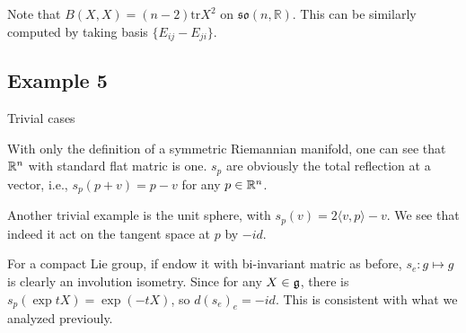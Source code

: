 	Note that $B(X,X)=(n-2)\mathrm{tr}X^2$ on
	$\mathfrak{so}(n,\mathbb R)$. This can be similarly computed
	by taking basis $\{E_{ij}-E_{ji}\}$.
	
	\subsection{Example 5}
	\begin{center}
		Trivial cases
	\end{center}
	
	With only the definition of a symmetric Riemannian manifold,
	one can see that ${\mathbb R}^n$ with standard flat matric is one.
	$s_p$ are obviously the total reflection at a vector, i.e.,
	$s_p(p+v)=p-v$ for any $p\in {\mathbb R}^n$. 
	
	Another trivial example is the unit sphere, with
	$s_p(v)=2\langle v,p\rangle-v$. We see that indeed it act on
	the tangent space at $p$ by $-id$. 
	
	For a compact Lie group, if endow it with bi-invariant matric
	as before, $s_e\colon g\mapsto g$ is clearly an involution
	isometry. Since for any $X\in{\mathfrak g}$, there is $s_p(\exp
	tX)=\exp(-tX)$, so $d(s_e)_e=-id$. This is consistent with
	what we analyzed previouly.
